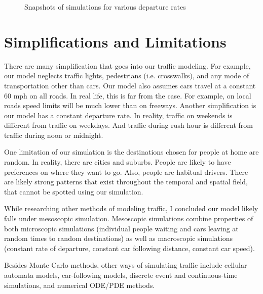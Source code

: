 \documentclass[11pt]{article}
\begin{document}
\begin{figure}[H]%
    \centering
    \caption{Snapshots of simulations for various departure rates}%
    \label{fig:maxLim}%
\end{figure}


\section{Simplifications and Limitations}
There are many simplification that goes into our traffic modeling. For example, our model neglects traffic lights, pedestrians (i.e. crosswalks), and any mode of transportation other than cars. Our model also assumes cars travel at a constant 60 mph on all roads. In real life, this is far from the case. For example, on local roads speed limits will be much lower than on freeways. Another simplification is our model has a constant departure rate. In reality, traffic on weekends is different from traffic on weekdays. And traffic during rush hour is different from traffic during noon or midnight.

One limitation of our simulation is the destinations chosen for people at home are random. In reality, there are cities and suburbs. People are likely to have preferences on where they want to go. Also, people are habitual drivers. There are likely strong patterns that exist throughout the temporal and spatial field, that cannot be spotted using our simulation.

While researching other methods of modeling traffic, I concluded our model likely falls under mesoscopic simulation. Mesoscopic simulations combine properties of both microscopic simulations (individual people waiting and cars leaving at random times to random destinations) as well as macroscopic simulations (constant rate of departure, constant car following distance, constant car speed). 

Besides Monte Carlo methods, other ways of simulating traffic include cellular automata models, car-following models, discrete event and continuous-time simulations, and numerical ODE/PDE methods.
\end{document}
